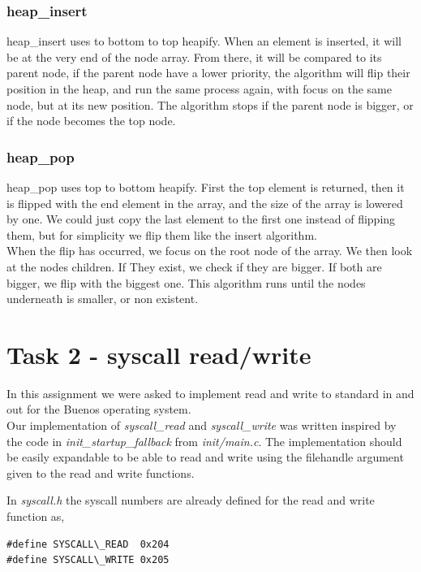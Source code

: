 \documentclass[11pt]{article}
\begin{document}
\subsubsection*{heap\_insert}
heap\_insert uses to bottom to top heapify. When an element is inserted, it will
be at the very end of the node array.  From there, it will be compared to its
parent node, if the parent node have a lower priority, the algorithm will flip
their position in the heap, and run the same process again, with focus on the
same node, but at its new position.  The algorithm stops if the parent node is
bigger, or if the node becomes the top node.

\subsubsection*{heap\_pop}
heap\_pop uses top to bottom heapify.  First the top element is returned, then
it is flipped with the end element in the array, and the size of the array is
lowered by one. We could just copy the last element to the first one instead of
flipping them, but for simplicity we flip them like the insert algorithm. \\
When the flip has occurred, we focus on the root node of the array.  We then
look at the nodes children.  If They exist, we check if they are bigger.  If
both are bigger, we flip with the biggest one.  This algorithm runs until the
nodes underneath is smaller, or non existent.

\section*{Task 2 - syscall read/write}
In this assignment we were asked to implement read and write to standard in and
out for the Buenos operating system. \\

Our implementation of \textit{syscall\_read} and \textit{syscall\_write} was
written inspired by the code in \textit{init\_startup\_fallback} from
\textit{init/main.c}.  The implementation should be easily expandable to be able
to read and write using the filehandle argument given to the read and write
functions.

In \textit{syscall.h} the syscall numbers are already defined for the read and
write function as,

\begin{lstlisting}[style=customc]
#define SYSCALL\_READ  0x204
#define SYSCALL\_WRITE 0x205
\end{lstlisting}
\end{document}

